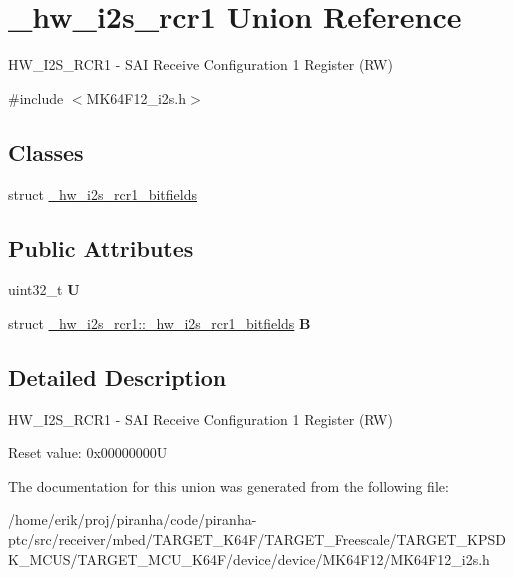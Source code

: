 \hypertarget{union__hw__i2s__rcr1}{}\section{\+\_\+hw\+\_\+i2s\+\_\+rcr1 Union Reference}
\label{union__hw__i2s__rcr1}


H\+W\+\_\+\+I2\+S\+\_\+\+R\+C\+R1 -\/ S\+AI Receive Configuration 1 Register (RW)  




{\ttfamily \#include $<$M\+K64\+F12\+\_\+i2s.\+h$>$}

\subsection*{Classes}
\begin{DoxyCompactItemize}
\item 
struct \hyperlink{struct__hw__i2s__rcr1_1_1__hw__i2s__rcr1__bitfields}{\+\_\+hw\+\_\+i2s\+\_\+rcr1\+\_\+bitfields}
\end{DoxyCompactItemize}
\subsection*{Public Attributes}
\begin{DoxyCompactItemize}
\item 
uint32\+\_\+t {\bfseries U}\hypertarget{union__hw__i2s__rcr1_a250d3081eed39077560d2626d579b30c}{}\label{union__hw__i2s__rcr1_a250d3081eed39077560d2626d579b30c}

\item 
struct \hyperlink{struct__hw__i2s__rcr1_1_1__hw__i2s__rcr1__bitfields}{\+\_\+hw\+\_\+i2s\+\_\+rcr1\+::\+\_\+hw\+\_\+i2s\+\_\+rcr1\+\_\+bitfields} {\bfseries B}\hypertarget{union__hw__i2s__rcr1_aacc111e9c54a1997f60372e1d8e587a5}{}\label{union__hw__i2s__rcr1_aacc111e9c54a1997f60372e1d8e587a5}

\end{DoxyCompactItemize}


\subsection{Detailed Description}
H\+W\+\_\+\+I2\+S\+\_\+\+R\+C\+R1 -\/ S\+AI Receive Configuration 1 Register (RW) 

Reset value\+: 0x00000000U 

The documentation for this union was generated from the following file\+:\begin{DoxyCompactItemize}
\item 
/home/erik/proj/piranha/code/piranha-\/ptc/src/receiver/mbed/\+T\+A\+R\+G\+E\+T\+\_\+\+K64\+F/\+T\+A\+R\+G\+E\+T\+\_\+\+Freescale/\+T\+A\+R\+G\+E\+T\+\_\+\+K\+P\+S\+D\+K\+\_\+\+M\+C\+U\+S/\+T\+A\+R\+G\+E\+T\+\_\+\+M\+C\+U\+\_\+\+K64\+F/device/device/\+M\+K64\+F12/M\+K64\+F12\+\_\+i2s.\+h\end{DoxyCompactItemize}
